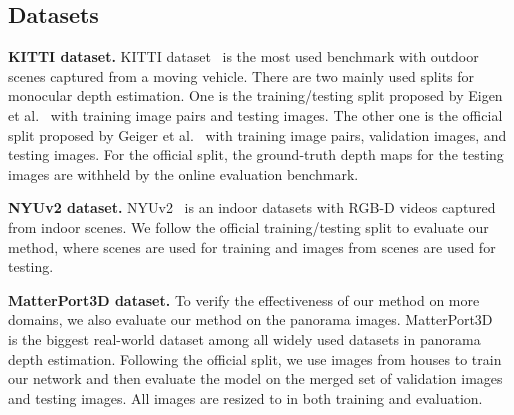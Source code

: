 \documentclass[10pt,twocolumn,letterpaper]{article}
\begin{document}
\subsection{Datasets}


\textbf{KITTI dataset.}
KITTI dataset~\cite{geiger2012we} is the most used benchmark with outdoor scenes captured from a moving vehicle. 
There are two mainly used splits for monocular depth estimation.
One is the training/testing split proposed by Eigen et al.~\cite{eigen2014depth} with  training image pairs and  testing images. The other one is the official split proposed by Geiger et al.~\cite{geiger2012we} with  training image pairs,  validation images, and  testing images. For the official split, the ground-truth depth maps for the testing images are withheld by the online evaluation benchmark. 





\textbf{NYUv2 dataset.}
NYUv2~\cite{silberman2012indoor} is an indoor datasets with  RGB-D videos captured from  indoor scenes. We follow the official training/testing split to evaluate our method, where  scenes are used for training and  images from  scenes are used for testing. 



\textbf{MatterPort3D dataset.}
To verify the effectiveness of our method on more domains, we also evaluate our method on the panorama images. MatterPort3D~\cite{chang2017matterport3d} is the biggest real-world dataset among all widely used datasets in panorama depth estimation. Following the official split, we use  images from  houses to train our network and then evaluate the model on the merged set of  validation images and  testing images. 
All images are resized to  in both training and evaluation.
\end{document}
